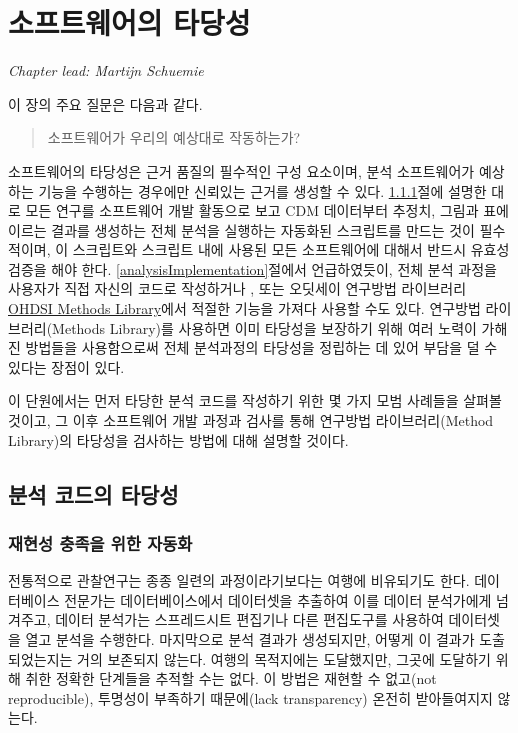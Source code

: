 \documentclass[10.5pt]{book}
\theoremstyle{definition}
\theoremstyle{definition}
\theoremstyle{definition}
\theoremstyle{remark}
\begin{document}
\chapter{소프트웨어의 타당성}\label{SoftwareValidity}

\emph{Chapter lead: Martijn Schuemie}

이 장의 주요 질문은 다음과 같다.

\begin{quote}
소프트웨어가 우리의 예상대로 작동하는가?
\end{quote}

소프트웨어의 타당성은 근거 품질의 필수적인 구성 요소이며, 분석
소프트웨어가 예상하는 기능을 수행하는 경우에만 신뢰있는 근거를 생성할 수
있다. \ref{automation}절에 설명한 대로 모든 연구를 소프트웨어 개발
활동으로 보고 CDM 데이터부터 추정치, 그림과 표에 이르는 결과를 생성하는
전체 분석을 실행하는 자동화된 스크립트를 만드는 것이 필수적이며, 이
스크립트와 스크립트 내에 사용된 모든 소프트웨어에 대해서 반드시 유효성
검증을 해야 한다. \ref{analysisImplementation}절에서 언급하였듯이, 전체
분석 과정을 사용자가 직접 자신의 코드로 작성하거나 , 또는 오딧세이
연구방법 라이브러리 \href{https://ohdsi.github.io/MethodsLibrary/}{OHDSI
Methods Library}에서 적절한 기능을 가져다 사용할 수도 있다. 연구방법
라이브러리(Methods Library)를 사용하면 이미 타당성을 보장하기 위해 여러
노력이 가해진 방법들을 사용함으로써 전체 분석과정의 타당성을 정립하는 데
있어 부담을 덜 수 있다는 장점이 있다. 

이 단원에서는 먼저 타당한 분석 코드를 작성하기 위한 몇 가지 모범
사례들을 살펴볼 것이고, 그 이후 소프트웨어 개발 과정과 검사를 통해
연구방법 라이브러리(Method Library)의 타당성을 검사하는 방법에 대해
설명할 것이다. 

\section{분석 코드의 타당성}\label{--}

\subsection{재현성 충족을 위한 자동화}\label{automation}

전통적으로 관찰연구는 종종 일련의 과정이라기보다는 여행에 비유되기도
한다. 데이터베이스 전문가는 데이터베이스에서 데이터셋을 추출하여 이를
데이터 분석가에게 넘겨주고, 데이터 분석가는 스프레드시트 편집기나 다른
편집도구를 사용하여 데이터셋을 열고 분석을 수행한다. 마지막으로 분석
결과가 생성되지만, 어떻게 이 결과가 도출되었는지는 거의 보존되지 않는다.
여행의 목적지에는 도달했지만, 그곳에 도달하기 위해 취한 정확한 단계들을
추적할 수는 없다. 이 방법은 재현할 수 없고(not reproducible), 투명성이
부족하기 때문에(lack transparency) 온전히 받아들여지지 않는다.
\end{document}
